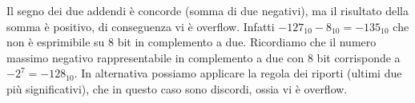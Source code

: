 \documentclass{article}
\begin{document}
\begin{enumerate}
\begin{center}
\end{center}

Il segno dei due addendi \`e concorde (somma di due negativi), ma il risultato della somma \`e positivo, di conseguenza  vi \`e overflow. Infatti $-127_{10}-8_{10} =-135_{10}$ che non \`e esprimibile su 8 bit in complemento a due. Ricordiamo che il numero massimo negativo rappresentabile in complemento a due con 8 bit corrisponde a $-2^7 = -128_{10}$. In alternativa possiamo applicare la regola dei riporti (ultimi due pi\`u significativi), che in questo caso sono discordi, ossia vi \`e overflow.

\end{enumerate}
\end{document}
